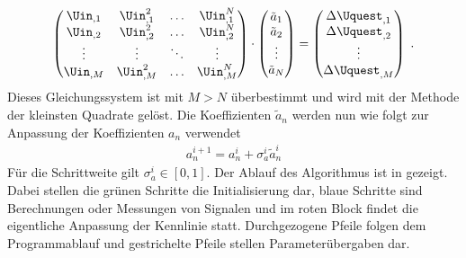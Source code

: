 \documentclass[../Report.tex]{subfiles}
\begin{document}
\begin{align}
	\left( 
	\begin{matrix}
	 	\Uin_{,1} & \Uin_{,1}^2 & \dots & \Uin_{,1}^N \\
		\Uin_{,2} & \Uin_{,2}^2 & \dots & \Uin_{,2}^N \\
		\vdots & \vdots & \ddots & \vdots \\
		\Uin_{,M} & \Uin_{,M}^2 & \dots & \Uin_{,M}^N \\
	\end{matrix}
	\right)
	\cdot
	\left(
	\begin{matrix}
		\tilde{a}_1 \\
		\tilde{a}_2 \\
		\vdots \\
		\tilde{a}_N \\	 
	\end{matrix}
	\right) = \left( 
	\begin{matrix}
		\Delta \Uquest_{,1} \\
		\Delta \Uquest_{,2} \\
		\vdots \\
		\Delta \Uquest_{,M} \\	 
	\end{matrix}
	\right) \; .
	\label{eq:Uquest.Gleichungssystem}
\end{align}
Dieses Gleichungssystem ist mit $M>N$ überbestimmt und wird mit der Methode der kleinsten Quadrate gelöst. Die Koeffizienten $\tilde{a}_n$ werden nun wie folgt zur Anpassung der Koeffizienten $a_n$ verwendet
\begin{align}
	\label{eq:opt.adjusta}
	a_n^{i+1} = a_n^{i} + \sigma_{a}^{i} \tilde{a}_n^{i}
\end{align}
Für die Schrittweite gilt $\sigma_{a}^i \in \left[ 0 , 1 \right]$. Der Ablauf des Algorithmus ist in  gezeigt. Dabei stellen die grünen Schritte die Initialisierung dar, blaue Schritte sind Berechnungen oder Messungen von Signalen und im roten Block findet die eigentliche Anpassung der Kennlinie statt. Durchgezogene Pfeile folgen dem Programmablauf und gestrichelte Pfeile stellen Parameterübergaben dar.
\end{document}
